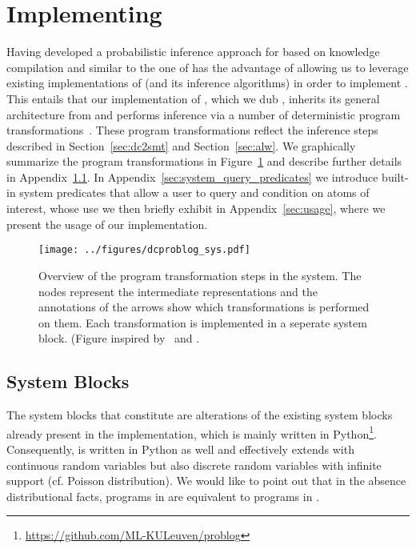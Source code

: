 
\section{Implementing \dcproblogsty}
\label{sec:implementation}

Having developed a probabilistic inference approach for \dcproblogsty based on knowledge compilation and similar to the one of \problogsty has the advantage of allowing us to leverage existing implementations of \problogsty (and its inference algorithms) in order to implement \dcproblogsty.
This entails that our implementation of \dcproblogsty, which we dub \dcproblogsys, inherits its general architecture from \problogsys and performs inference via a number of deterministic program transformations~\citep{dries2015problog2}. These program transformations reflect the inference steps described in Section~\ref{sec:dc2smt} and Section~\ref{sec:alw}.
We graphically summarize the program transformations in Figure~\ref{figure:dcproblog_sys} and describe further details in Appendix~\ref{sec:system_blocks}.
In Appendix~\ref{sec:system_query_predicates} we introduce built-in system predicates that allow a user to query and condition on atoms of interest, whose use we then briefly exhibit in Appendix~\ref{sec:usage}, where we present the usage of our implementation.


\begin{figure}[h]
	\centering
	\texttt{[image: ../figures/dcproblog\_sys.pdf]}
	\caption[Overview of the program transformation steps in the \dcproblogsys system]{Overview of the program transformation steps in the \dcproblogsys system. The nodes represent the intermediate representations and the annotations of the arrows show which transformations is performed on them. Each transformation is implemented in a seperate system block. (Figure inspired by~\protect\citep[Figure 2]{zuidbergdosmartires2019transforming} and \citep[Figure 1]{dries2015problog2}.}
	\label{figure:dcproblog_sys}
\end{figure}





\subsection{System Blocks}
\label{sec:system_blocks}

The system blocks that constitute \dcproblogsys are alterations of the existing system blocks already present in the \problogsys implementation, which is mainly written in Python\footnote{\url{https://github.com/ML-KULeuven/problog}}. Consequently, \dcproblogsys is written in Python as well and effectively extends \problogsys with continuous random variables but also discrete random variables with infinite support (cf. Poisson distribution). We would like to point out that in the absence distributional facts, \dcproblogsty programs in \dcproblogsys are equivalent to \problogsty programs in \problogsys.

